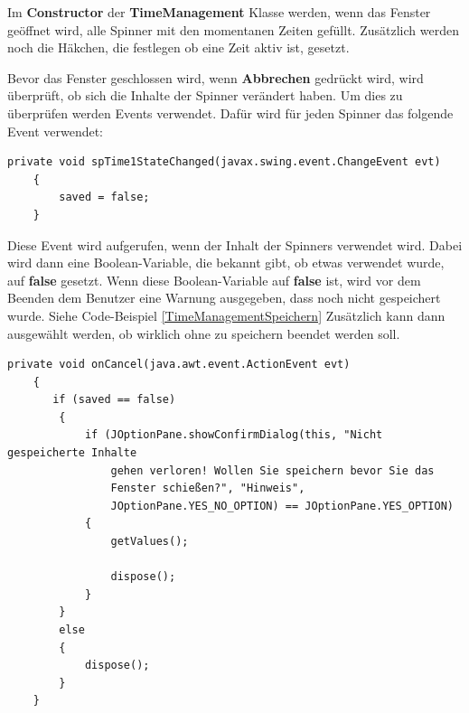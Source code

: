 \vspace{10pt}

Im \textbf{Constructor} der \textbf{TimeManagement} Klasse werden, wenn das Fenster geöffnet wird, alle Spinner mit den momentanen Zeiten gefüllt. Zusätzlich werden noch die Häkchen, die festlegen ob eine Zeit aktiv ist, gesetzt.

\vspace{10pt}

Bevor das Fenster geschlossen wird, wenn \textbf{Abbrechen} gedrückt wird, wird überprüft, ob sich die Inhalte der Spinner verändert haben. Um dies zu überprüfen werden Events verwendet. Dafür wird für jeden Spinner das folgende Event verwendet:
\begin{lstlisting}[style=JavaStyle, caption=Spinner Event]
    private void spTime1StateChanged(javax.swing.event.ChangeEvent evt)                                     
    {                                         
        saved = false;
    }   
\end{lstlisting} 
Diese Event wird aufgerufen, wenn der Inhalt der Spinners verwendet wird. Dabei wird dann eine Boolean-Variable, die bekannt gibt, ob etwas verwendet wurde, auf \textbf{false} gesetzt. Wenn diese Boolean-Variable auf \textbf{false} ist, wird vor dem Beenden dem Benutzer eine Warnung ausgegeben, dass noch nicht gespeichert wurde. Siehe Code-Beispiel \ref{TimeManagementSpeichern} Zusätzlich kann dann ausgewählt werden, ob wirklich ohne zu speichern beendet werden soll.

\begin{lstlisting}[style=Javastyle, caption=TimeManagement Fenster schließen, label=TimeManagementSpeichern]
 private void onCancel(java.awt.event.ActionEvent evt)                          
    {                              
       if (saved == false)
        {
            if (JOptionPane.showConfirmDialog(this, "Nicht gespeicherte Inhalte 
            	gehen verloren! Wollen Sie speichern bevor Sie das 
            	Fenster schießen?", "Hinweis", 
            	JOptionPane.YES_NO_OPTION) == JOptionPane.YES_OPTION)
            {
                getValues();
                
                dispose();
            }
        }
        else
        {
            dispose();
        }
    }
\end{lstlisting}

\vspace{10pt}


